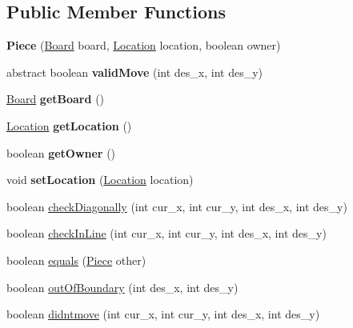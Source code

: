 \subsection*{Public Member Functions}
\begin{DoxyCompactItemize}
\item 
\hypertarget{classMain_1_1Piece_a356ab2be8787119b81978aa86cb1015f}{{\bfseries Piece} (\hyperlink{classMain_1_1Board}{Board} board, \hyperlink{classMain_1_1Location}{Location} location, boolean owner)}\label{classMain_1_1Piece_a356ab2be8787119b81978aa86cb1015f}

\item 
\hypertarget{classMain_1_1Piece_aaae371fd02262c770ff5d83f84a7c36b}{abstract boolean {\bfseries valid\-Move} (int des\-\_\-x, int des\-\_\-y)}\label{classMain_1_1Piece_aaae371fd02262c770ff5d83f84a7c36b}

\item 
\hypertarget{classMain_1_1Piece_aff1443bf99c1f2b945ca6b62cc7ab83d}{\hyperlink{classMain_1_1Board}{Board} {\bfseries get\-Board} ()}\label{classMain_1_1Piece_aff1443bf99c1f2b945ca6b62cc7ab83d}

\item 
\hypertarget{classMain_1_1Piece_ac70f538f6f546f4c9a2df7485d23b2e5}{\hyperlink{classMain_1_1Location}{Location} {\bfseries get\-Location} ()}\label{classMain_1_1Piece_ac70f538f6f546f4c9a2df7485d23b2e5}

\item 
\hypertarget{classMain_1_1Piece_a3921dc492afd3cd1e239fbfa493d5bf0}{boolean {\bfseries get\-Owner} ()}\label{classMain_1_1Piece_a3921dc492afd3cd1e239fbfa493d5bf0}

\item 
\hypertarget{classMain_1_1Piece_a4c08c2f6db7a88ab8e389eec1f687bf8}{void {\bfseries set\-Location} (\hyperlink{classMain_1_1Location}{Location} location)}\label{classMain_1_1Piece_a4c08c2f6db7a88ab8e389eec1f687bf8}

\item 
boolean \hyperlink{classMain_1_1Piece_a0da910c70197865464bb648b7c9d0b30}{check\-Diagonally} (int cur\-\_\-x, int cur\-\_\-y, int des\-\_\-x, int des\-\_\-y)
\item 
boolean \hyperlink{classMain_1_1Piece_acff6a3943d4e438ab160d99b76542a9f}{check\-In\-Line} (int cur\-\_\-x, int cur\-\_\-y, int des\-\_\-x, int des\-\_\-y)
\item 
boolean \hyperlink{classMain_1_1Piece_a6486c6a36aa8a5fc236ce70106f8515b}{equals} (\hyperlink{classMain_1_1Piece}{Piece} other)
\item 
boolean \hyperlink{classMain_1_1Piece_a36e44ac99520481a1100a173c03d9512}{out\-Of\-Boundary} (int des\-\_\-x, int des\-\_\-y)
\item 
boolean \hyperlink{classMain_1_1Piece_ace2546caba6c053f2b43358319af0399}{didntmove} (int cur\-\_\-x, int cur\-\_\-y, int des\-\_\-x, int des\-\_\-y)
\end{DoxyCompactItemize}


